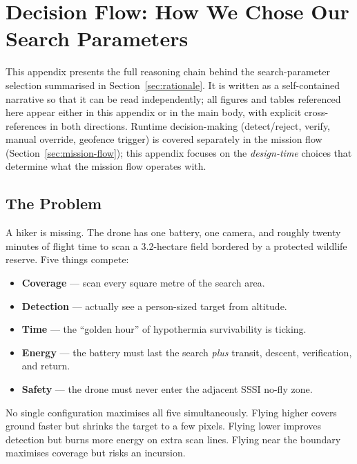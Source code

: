 
\section{Decision Flow: How We Chose Our Search Parameters}\label{app:decision-flow}

This appendix presents the full reasoning chain behind the search-parameter selection summarised in Section~\ref{sec:rationale}. It is written as a self-contained narrative so that it can be read independently; all figures and tables referenced here appear either in this appendix or in the main body, with explicit cross-references in both directions. Runtime decision-making (detect/reject, verify, manual override, geofence trigger) is covered separately in the mission flow (Section~\ref{sec:mission-flow}); this appendix focuses on the \emph{design-time} choices that determine what the mission flow operates with.

\subsection{The Problem}\label{sec:df-problem}

A hiker is missing. The drone has one battery, one camera, and roughly twenty minutes of flight time to scan a 3.2-hectare field bordered by a protected wildlife reserve. Five things compete:

\begin{itemize}[nosep]
  \item \textbf{Coverage} --- scan every square metre of the search area.
  \item \textbf{Detection} --- actually see a person-sized target from altitude.
  \item \textbf{Time} --- the ``golden hour'' of hypothermia survivability is ticking.
  \item \textbf{Energy} --- the battery must last the search \emph{plus} transit, descent, verification, and return.
  \item \textbf{Safety} --- the drone must never enter the adjacent SSSI no-fly zone.
\end{itemize}

No single configuration maximises all five simultaneously. Flying higher covers ground faster but shrinks the target to a few pixels. Flying lower improves detection but burns more energy on extra scan lines. Flying near the boundary maximises coverage but risks an incursion.

